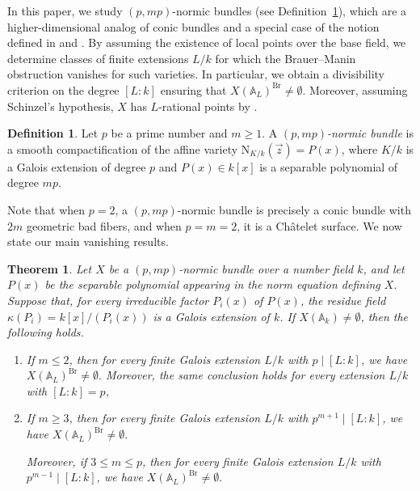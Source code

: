 \documentclass[10pt]{amsart}
\theoremstyle{plain}
\newtheorem{theorem}[thm]{Theorem}
\theoremstyle{definition}
\newtheorem{definition}[thm]{Definition}
\newcommand{\A}{{\mathbb A}}
\newcommand{\Nm}{\mathrm{N}}
\newcommand{\Br}{\operatorname{Br}}
\begin{document}
In this paper, we study $(p,mp)$-normic bundles (see Definition~\ref{normic bundle}), which are a higher-dimensional analog of conic bundles and a special case of the notion defined in \cite{AVB} and \cite{AB}. By assuming the existence of local points over the base field, we determine classes of finite extensions $L/k$ for which the Brauer--Manin obstruction vanishes for such varieties. In particular, we obtain a divisibility criterion on the degree $[L:k]$ ensuring that $X(\A_L)^{\Br} \neq \emptyset$. Moreover, assuming Schinzel's hypothesis\cite{ScH}, \(X\) has $L$-rational points by \cite[Theorem~4.2]{CsD}.

\begin{definition}\label{normic bundle}
    Let $p$ be a prime number and $m\geq 1$. A \emph{$(p,mp)$-normic bundle} is a smooth compactification of the affine variety $\Nm_{K/k}(\vec{z})=P(x)$, where $K/k$ is a Galois extension of degree $p$ and $P(x)\in k[x]$ is a separable polynomial of degree $mp$. 

\end{definition}

Note that when $p=2$, a $(p,mp)$-normic bundle is precisely a conic bundle with $2m$ geometric bad fibers, and when \(p=m=2\), it is a Ch\^atelet surface. We now state our main vanishing results.

\begin{theorem}\label{main-vanishing}
Let \(X\) be a \((p,mp)\)-normic bundle over a number field \(k\), and let $P(x)$ be the separable polynomial appearing in the norm equation defining $X$. Suppose that, for every irreducible
factor \(P_i(x)\) of \(P(x)\), the residue field
\(\kappa(P_i)=k[x]/(P_i(x))\) is a Galois extension of \(k\). If
\(X(\A_k)\neq\emptyset\), then the following holds.

\begin{enumerate}
    \item If \(m \leq 2\), then for every finite Galois extension
    \(L/k\) with \(p\mid[L:k]\), we have \( X(\A_L)^{\Br}\neq\emptyset.\)
    Moreover, the same conclusion holds for every extension \(L/k\) with \([L:k]=p\),
    
    \item If \(m\ge3\), then for every finite Galois extension \(L/k\) with
    \(p^{m+1}\mid[L:k]\), we have \(X(\A_L)^{\Br}\neq\emptyset.\) 
    
    Moreover, if \(3\le m\le p\), then for every finite Galois extension \(L/k\)
    with \(p^{m-1}\mid[L:k]\), we have
    \( X(\A_L)^{\Br}\neq\emptyset.\)
\end{enumerate}
\end{theorem}
\end{document}
